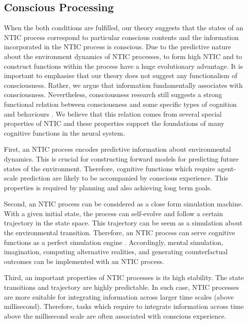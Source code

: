 \documentclass[utf8]{article}
\begin{document}
        

		\subsection{Conscious Processing}
		When the both conditions are fulfilled, our theory suggests that the states of an NTIC process correspond to particular conscious contents and the information incorporated in the NTIC process is conscious. Due to the predictive nature about the environment dynamics of NTIC processes, to form high NTIC and to construct functions within the process have a huge evolutionary advantage. It is important to emphasise that our theory does not suggest any functionalism of consciousness. Rather, we argue that information fundamentally associates with consciousness. Nevertheless, consciousness research still suggests a strong functional relation between consciousness and some specific types of cognition and behaviours \citep{Seth2009Encyclopediaofconsciousness}. We believe that this relation comes from several special properties of NTIC and these properties support the foundations of many cognitive functions in the neural system.
		
		First, an NTIC process encodes predictive information about environmental dynamics. This is crucial for constructing forward models for predicting future states of the environment. Therefore, cognitive functions which require agent-scale prediction are likely to be accompanied by conscious experience. This properties is required by planning and also achieving long term goals.\needref{}
		
		Second, an NTIC process can be considered as a close form simulation machine. With a given initial state, the process can self-evolve and follow a certain trajectory in the state space. This trajectory can be seem as a simulation about the environmental transition. Therefore, an NTIC process can serve cognitive functions as a perfect simulation engine \citep{BERTSCHINGER.2006}. Accordingly, mental simulation, imagination, computing alternative realities, and generating counterfactual outcomes can be implemented with an NTIC process. \needref{}
		
	    Third, an important properties of NTIC processes is its high stability. The state transitions and trajectory are highly predictable. In such case, NTIC processes are more suitable for integrating information across larger time scales (above millisecond). Therefore, tasks which require to integrate information across time above the millisecond scale are often associated with conscious experience. 
	    
\end{document}
